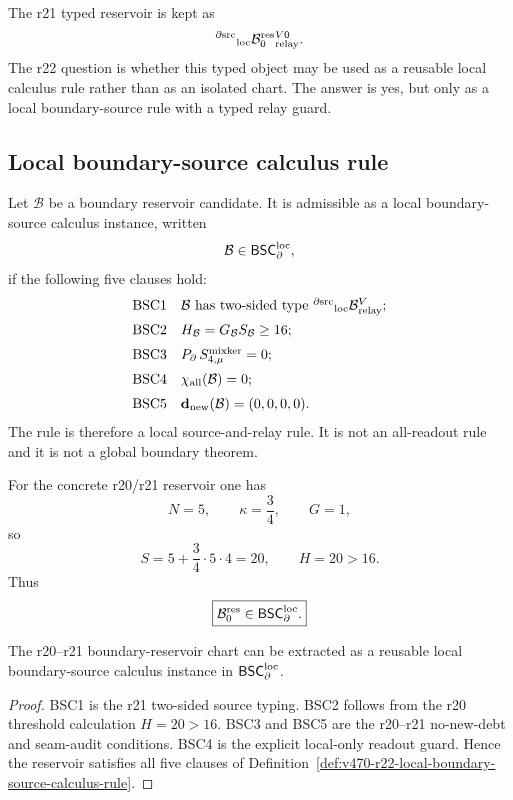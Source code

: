 The r21 typed reservoir is kept as
\[
{}^{\partial{\rm src}}{}_{\rm loc}\mathcal B_0^{\rm res}{}^{V0}_{\rm relay}.
\]
The r22 question is whether this typed object may be used as a reusable local
calculus rule rather than as an isolated chart.  The answer is yes, but only as a
local boundary-source rule with a typed relay guard.

\subsection{Local boundary-source calculus rule}
\label{subsec:v470-r22-local-boundary-source-calculus-rule}

\begin{definition}
\label{def:v470-r22-local-boundary-source-calculus-rule}
Let \(\mathcal B\) be a boundary reservoir candidate.  It is admissible as a
local boundary-source calculus instance, written
\[
\mathcal B\in\mathsf{BSC}_{\partial}^{\rm loc},
\]
if the following five clauses hold:
\[
\begin{array}{ll}
{\rm BSC1} & \mathcal B\text{ has two-sided type }
{}^{\partial{\rm src}}{}_{\rm loc}\mathcal B{}^{V}_{\rm relay};\\[2mm]
{\rm BSC2} & H_{\mathcal B}=G_{\mathcal B}S_{\mathcal B}\geq 16;\\[2mm]
{\rm BSC3} & P_{\partial}\,S_{4,\mu}^{\rm mixker}=0;\\[2mm]
{\rm BSC4} & \chi_{\rm all}(\mathcal B)=0;\\[2mm]
{\rm BSC5} & \mathbf d_{\rm new}(\mathcal B)=(0,0,0,0).
\end{array}
\]
The rule is therefore a local source-and-relay rule.  It is not an all-readout
rule and it is not a global boundary theorem.
\end{definition}

For the concrete r20/r21 reservoir one has
\[
N=5,\qquad \kappa=\frac34,\qquad G=1,
\]
so
\[
S=5+\frac34\cdot5\cdot4=20,
\qquad
H=20>16.
\]
Thus
\[
\boxed{
\mathcal B_0^{\rm res}\in\mathsf{BSC}_{\partial}^{\rm loc}.
}
\]

\begin{lemma}
\label{lem:v470-r22-boundary-source-calculus-extraction}
The r20--r21 boundary-reservoir chart can be extracted as a reusable local
boundary-source calculus instance in \(\mathsf{BSC}_{\partial}^{\rm loc}\).
\end{lemma}

\begin{proof}
BSC1 is the r21 two-sided source typing.  BSC2 follows from the r20 threshold
calculation \(H=20>16\).  BSC3 and BSC5 are the r20--r21 no-new-debt and seam-audit
conditions.  BSC4 is the explicit local-only readout guard.  Hence the reservoir
satisfies all five clauses of Definition~\ref{def:v470-r22-local-boundary-source-calculus-rule}.
\end{proof}

